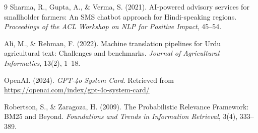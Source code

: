 \documentclass[12pt, a4paper]{article}
\begin{document}
\begin{onehalfspacing}
\begin{thebibliography}{9}
Sharma, R., Gupta, A., \& Verma, S. (2021).
\newblock AI-powered advisory services for smallholder farmers: An SMS chatbot
  approach for Hindi-speaking regions.
\newblock \textit{Proceedings of the ACL Workshop on NLP for Positive Impact},
  45--54.

Ali, M., \& Rehman, F. (2022).
\newblock Machine translation pipelines for Urdu agricultural text: Challenges
  and benchmarks.
\newblock \textit{Journal of Agricultural Informatics}, 13(2), 1--18.

OpenAI. (2024).
\newblock \textit{GPT-4o System Card}.
\newblock Retrieved from \url{https://openai.com/index/gpt-4o-system-card/}

Robertson, S., \& Zaragoza, H. (2009).
\newblock The Probabilistic Relevance Framework: BM25 and Beyond.
\newblock \textit{Foundations and Trends in Information Retrieval}, 3(4), 333--389.

\end{thebibliography}

\end{onehalfspacing}
\end{document}
